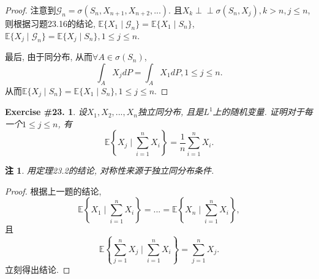 \documentclass[UTF8, a4paper]{article}
\newcommand{\Perp}{\perp\!\!\!\!\perp}
\newtheorem{exercise}{Exercise \#23.}
\newtheorem*{remark}{注}
\begin{document}
\begin{proof}
注意到\(\mathcal{G}_n = \sigma(S_n, X_{n+1}, X_{n+2}, ...)\).
且\(X_k \Perp \sigma(S_n, X_j), k > n, j \leq n\), 
则根据习题23.16的结论,
\(\mathbb{E}\{X_1 \mid \mathcal{G}_n\} = \mathbb{E}\{X_1 \mid S_n\}\), \(\mathbb{E}\{X_j \mid \mathcal{G}_n\} = \mathbb{E}\{X_j \mid S_n\}, 1 \leq j \leq n\).

最后, 由于同分布, 从而\(\forall A \in \sigma(S_n)\), 
$$
\int_A X_j dP = \int_A X_1 dP, 1 \leq j \leq n.
$$
从而\(\mathbb{E}\{X_j \mid S_n\} = \mathbb{E}\{X_1 \mid S_n\}, 1 \leq j \leq n\).
\end{proof}




\begin{framed}
\begin{exercise}
设\(X_1, X_2, ..., X_n\)独立同分布, 且是\(L^1\)上的随机变量.
证明对于每一个\(1 \leq j\leq n\), 有
$$
\mathbb{E}\left\{X_j \mid \sum_{i = 1}^{n}X_i\right\} = \frac{1}{n} \sum_{i = 1}^{n} X_i.
$$
\end{exercise}
\end{framed}

\begin{remark}
用定理23.2的结论, 对称性来源于独立同分布条件.
\end{remark}

\begin{proof}
根据上一题的结论, 
$$
\mathbb{E}\left\{X_1 \mid \sum_{i = 1}^{n}X_i\right\} = ... = \mathbb{E}\left\{X_n \mid \sum_{i = 1}^{n}X_i\right\} ,
$$
且 
$$
\mathbb{E}\left\{\sum_{j=1}^{n}X_j \mid \sum_{i = 1}^{n}X_i\right\} = \sum_{j=1}^{n} X_j.
$$
立刻得出结论.
\end{proof}





\end{document}
